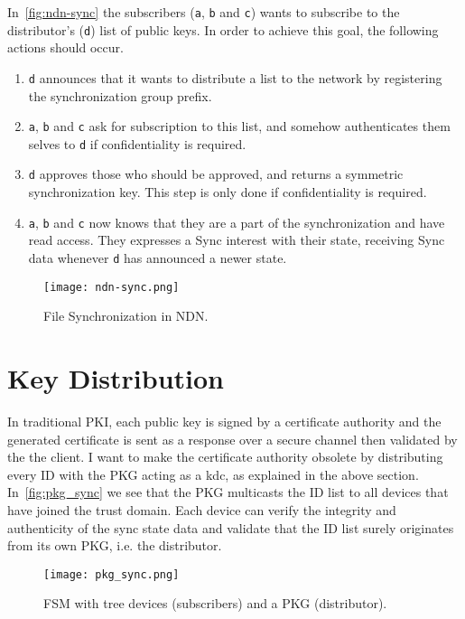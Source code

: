 In~\autoref{fig:ndn-sync} the subscribers (\texttt{a}, \texttt{b} and \texttt{c}) wants to subscribe to the distributor's (\texttt{d}) list of public keys.
In order to achieve this goal, the following actions should occur.
\begin{enumerate}
	\item \texttt{d} announces that it wants to distribute a list to the network by registering the synchronization group prefix. 
	\item \texttt{a}, \texttt{b} and \texttt{c} ask for subscription to this list, and somehow authenticates them selves to \texttt{d} if confidentiality is required.
	\item \texttt{d} approves those who should be approved, and returns a symmetric synchronization key. 
	This step is only done if confidentiality is required.
	\item \texttt{a}, \texttt{b} and \texttt{c} now knows that they are a part of the synchronization and have read access. They expresses a Sync \gls{interest} with their state, receiving Sync \gls{data} whenever \texttt{d} has announced a newer state.
\end{enumerate}

\begin{figure}[ht]
  \centering
  \texttt{[image: ndn-sync.png]}
  \caption{File Synchronization in NDN.}
  \label{fig:ndn-sync}
\end{figure}

\section{Key Distribution}\label{key-distribution}
In traditional \gls{PKI}, each public key is signed by a certificate authority and the generated certificate is sent as a response over a secure channel then validated by the the client.
I want to make the certificate authority obsolete by distributing every \gls{ID} with the \gls{PKG} acting as a \gls{kdc}, as explained in the above section.
In~\autoref{fig:pkg_sync} we see that the \gls{PKG} multicasts the \gls{ID} list to all devices that have joined the trust domain.
Each device can verify the integrity and authenticity of the sync state \gls{data} and validate that the \gls{ID} list surely originates from its own \gls{PKG}, i.e. the distributor.
\begin{figure}[ht]
  \centering
  \texttt{[image: pkg\_sync.png]}
  \caption{FSM with tree devices (subscribers) and a PKG (distributor).}
  \label{fig:pkg_sync}
\end{figure}


